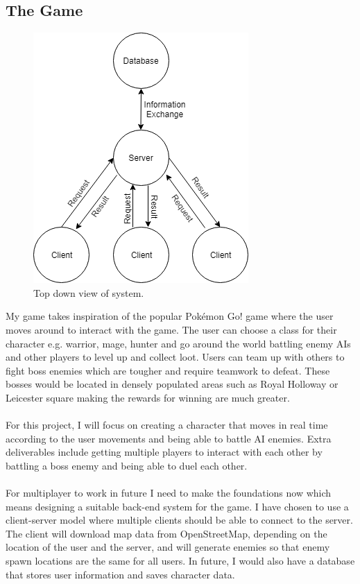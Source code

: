 \documentclass[a4paper]{report}
\begin{document}
\subsection{The Game}
\begin{figure}
	\caption{Top down view of system.}\label{wrap-fig:1}
	\includegraphics[scale=0.5]{"System Design"}
\end{figure} 
My game takes inspiration of the popular Pokémon Go! game where the user moves around to interact with the game. The user can choose a class for their character e.g. warrior, mage, hunter and go around the world battling enemy AIs and other players to level up and collect loot. Users can team up with others to fight boss enemies which are tougher and require teamwork to defeat. These bosses would be located in densely populated areas such as Royal Holloway or Leicester square making the rewards for winning are much greater.
\\\\
For this project, I will focus on creating a character that moves in real time according to the user movements and being able to battle AI enemies. Extra deliverables include getting multiple players to interact with each other by battling a boss enemy and being able to duel each other.
\\\\
For multiplayer to work in future I need to make the foundations now which means designing a suitable back-end system for the game. I have chosen to use a client-server model where multiple clients should be able to connect to the server. The client will download map data from OpenStreetMap, depending on the location of the user and the server, and will generate enemies so that enemy spawn locations are the same for all users. In future, I would also have a database that stores user information and saves character data. 
\end{document}

